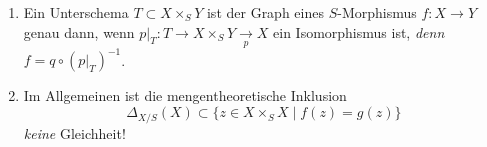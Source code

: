 \begin{rem}[29]
  \mbox{}
  \begin{enumerate}
  \item Ein Unterschema $T\subset X\times_{S}Y$ ist der Graph eines $S$-Morphismus
    $f:X\rightarrow Y$ genau dann, wenn $p|_{T}:T\rightarrow X\times_{S}Y\underset{p}{\rightarrow}X$
    ein Isomorphismus ist, \emph{denn} $f=q\circ(p|_{T})^{-1}$.
  \item Im Allgemeinen ist die mengentheoretische Inklusion
    \[
      \Delta_{X/S}(X)\subset\{z\in X\times_{S}X\mid f(z)=g(z)\}
    \]
    \emph{keine} Gleichheit!
  \end{enumerate}
\end{rem}

